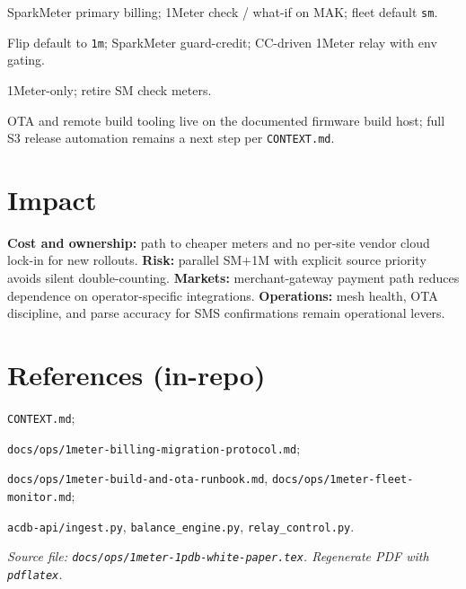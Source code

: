 \documentclass[11pt,a4paper]{article}
\begin{document}
\begin{description}[style=nextline]
  \item[Phase 1 (active)] SparkMeter primary billing; 1Meter check / what-if on MAK; fleet default \texttt{sm}.
  \item[Phase 2 (designed, gated)] Flip default to \texttt{1m}; SparkMeter guard-credit; CC-driven 1Meter relay with env gating.
  \item[Phase 3 (future)] 1Meter-only; retire SM check meters.
\end{description}

OTA and remote build tooling live on the documented firmware build host; full S3 release automation remains a next step per \texttt{CONTEXT.md}.

\section{Impact}

\textbf{Cost and ownership:} path to cheaper meters and no per-site vendor cloud lock-in for new rollouts. \textbf{Risk:} parallel SM+1M with explicit source priority avoids silent double-counting. \textbf{Markets:} merchant-gateway payment path reduces dependence on operator-specific integrations. \textbf{Operations:} mesh health, OTA discipline, and parse accuracy for SMS confirmations remain operational levers.

\section{References (in-repo)}

\noindent
\texttt{CONTEXT.md};

\noindent
\texttt{docs/ops/1meter-billing-migration-protocol.md};

\noindent
\texttt{docs/ops/1meter-build-and-ota-runbook.md}, \texttt{docs/ops/1meter-fleet-monitor.md};

\noindent
\texttt{acdb-api/ingest.py}, \texttt{balance\_engine.py}, \texttt{relay\_control.py}.

\vfill
\noindent\textit{Source file: \texttt{docs/ops/1meter-1pdb-white-paper.tex}. Regenerate PDF with \texttt{pdflatex}.}
\end{document}
